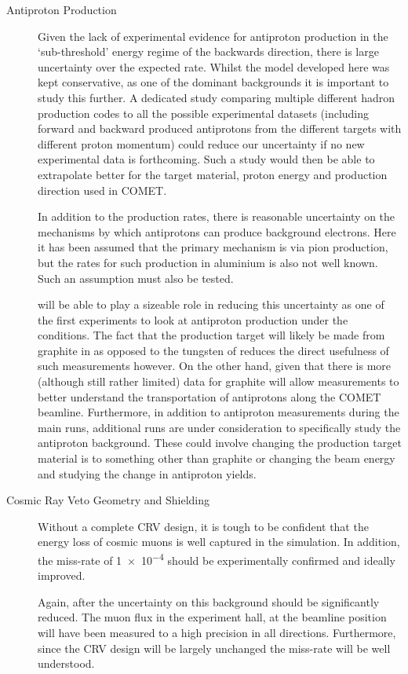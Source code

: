 \begin{description}
\item[Antiproton Production]
Given the lack of experimental evidence for antiproton production in the `sub-threshold' energy regime of the backwards direction, there is large uncertainty over the expected rate.
Whilst the model developed here was kept conservative, as one of the dominant backgrounds it is important to study this further.
A dedicated study comparing multiple different hadron production codes to all the possible experimental datasets (including forward and backward produced antiprotons from the different targets with different proton momentum) could reduce our uncertainty if no new experimental data is forthcoming.
Such a study would then be able to extrapolate better for the target material, proton energy and production direction used in COMET.

In addition to the production rates, there is reasonable uncertainty on the mechanisms by which antiprotons can produce background electrons.
Here it has been assumed that the primary mechanism is via pion production, but the rates for such production in aluminium is also not well known.
Such an assumption must also be tested.

\phaseI will be able to play a sizeable role in reducing this uncertainty as one of the first experiments to look at antiproton production under the \COMET conditions.
The fact that the production target will likely be made from graphite in \phaseI as opposed to the tungsten of \phaseII reduces the direct usefulness of such measurements however.
On the other hand, given that there is more (although still rather limited) data for graphite will allow \phaseI measurements to better understand the transportation of antiprotons along the COMET beamline.
Furthermore, in addition to antiproton measurements during the main \phaseI runs, additional runs are under consideration to specifically study the antiproton background.
These could involve changing the production target material is to something other than graphite or changing the beam energy and studying the change in antiproton yields.

\item[Cosmic Ray Veto Geometry and Shielding]
Without a complete \ac{CRV} design, it is tough to be confident that the energy loss of cosmic muons is well captured in the \phaseII simulation.
In addition, the miss-rate of \num{1e-4} should be experimentally confirmed and ideally improved.

Again, after \phaseI the uncertainty on this background should be significantly reduced.
The muon flux in the experiment hall, at the beamline position will have been measured to a high precision in all directions.
Furthermore, since the CRV design will be largely unchanged the miss-rate will be well understood.
\end{description}

